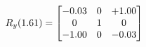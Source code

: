 \documentclass[preview]{standalone}
\begin{document}
\begin{align*}
\special{dvisvgm:raw <g id='unique000'>}R_{y}(1.61) = \begin{bmatrix}-0.03 & 0 & +1.00 \\0 & 1 & 0 \\-1.00 & 0 & -0.03\end{bmatrix}\special{dvisvgm:raw </g>}
\end{align*}
\end{document}
